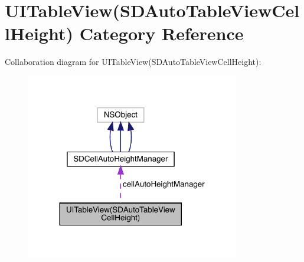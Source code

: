 \hypertarget{category_u_i_table_view_07_s_d_auto_table_view_cell_height_08}{}\section{U\+I\+Table\+View(S\+D\+Auto\+Table\+View\+Cell\+Height) Category Reference}
\label{category_u_i_table_view_07_s_d_auto_table_view_cell_height_08}


Collaboration diagram for U\+I\+Table\+View(S\+D\+Auto\+Table\+View\+Cell\+Height)\+:\nopagebreak
\begin{figure}[H]
\begin{center}
\leavevmode
\includegraphics[width=264pt]{category_u_i_table_view_07_s_d_auto_table_view_cell_height_08__coll__graph}
\end{center}
\end{figure}
